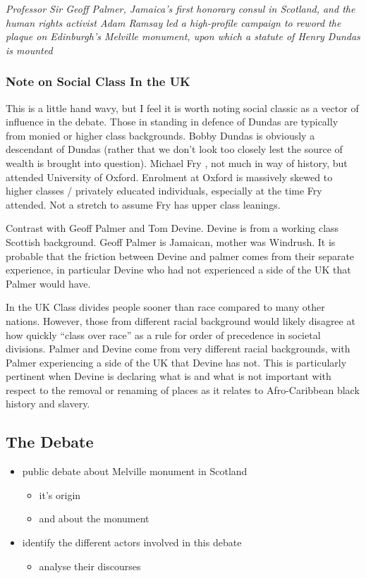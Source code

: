 \documentclass{scrartcl}
\begin{document}
\textit{Professor Sir Geoff Palmer, Jamaica’s first honorary consul in Scotland, and the human rights activist Adam Ramsay led a high-profile campaign to reword the plaque on Edinburgh’s Melville monument, upon which a statute of Henry Dundas is mounted}\cite{mullen_2022}

\subsubsection{Note on Social Class In the UK}

This is a little hand wavy, but I feel it is worth noting social classic as a vector of influence in the debate. Those in standing in defence of Dundas are typically from monied or higher class backgrounds. Bobby Dundas is obviously a descendant of Dundas (rather that we don't look too closely lest the source of wealth is brought into question). Michael Fry , not much in way of history, but attended University of Oxford. Enrolment at Oxford is massively skewed to higher classes / privately educated individuals, especially at the time Fry attended. Not a stretch to assume Fry has upper class leanings.    

Contrast with Geoff Palmer and Tom Devine. Devine is from a working class Scottish background. Geoff Palmer is Jamaican, mother was Windrush. It  is probable that the friction between Devine and palmer comes from their separate experience, in particular Devine who had not experienced a side of the UK that Palmer would have.

In the UK Class divides people sooner than race compared to many other nations. However, those from different racial background would likely disagree at how quickly ``class over race'' as a rule for order of precedence in societal divisions.  Palmer and Devine come from very different racial backgrounds, with Palmer experiencing a side of the UK that Devine has not. This  is particularly pertinent when Devine is declaring what is and what is not important with respect to the removal or renaming of places as it relates to Afro-Caribbean black history and slavery.

\subsection{The Debate}

\begin{itemize}
    \item public debate about Melville monument in Scotland
    \begin{itemize}
        \item it's origin
    \end{itemize}
    \begin{itemize}
        \item and about the monument
    \end{itemize}
    \item identify the different actors involved in this debate
    \begin{itemize}
        \item analyse their discourses
    \end{itemize}
\end{itemize}
\end{document}
